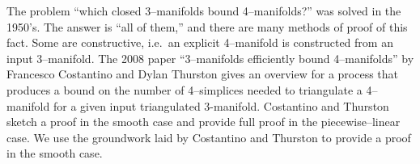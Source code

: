 The problem ``which closed 3--manifolds bound 4--manifolds?'' was solved in the 1950's.
The answer is ``all of them,'' and there are many methods of proof of this fact.
Some are constructive, i.e.\ an explicit 4--manifold is constructed from an input 3--manifold.
The 2008 paper ``3--manifolds efficiently bound 4--manifolds'' by Francesco Costantino and Dylan Thurston gives an overview for a process that produces a bound on the number of 4--simplices needed to triangulate a 4--manifold for a given input triangulated 3-manifold.
Costantino and Thurston sketch a proof in the smooth case and provide full proof in the piecewise--linear case.
We use the groundwork laid by Costantino and Thurston to provide a proof in the smooth case.